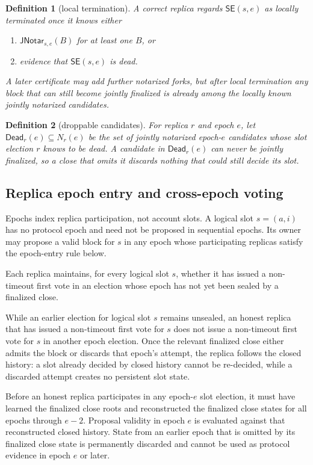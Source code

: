 \documentclass[11pt]{article}
\newtheorem{definition}{Definition}
\theoremstyle{remark}
\newcommand{\SE}{\mathsf{SE}}
\newcommand{\JNotar}{\mathsf{JNotar}}
\newcommand{\Dead}{\mathsf{Dead}}
\begin{document}
\begin{definition}[local termination]
A correct replica regards $\SE(s,e)$ as \emph{locally terminated} once it knows either
\begin{enumerate}[label=(\roman*),nosep]
  \item $\JNotar_{s,e}(B)$ for at least one $B$, or
  \item evidence that $\SE(s,e)$ is dead.
\end{enumerate}
A later certificate may add further notarized forks, but after local termination any block that can still become jointly finalized is already among the locally known jointly notarized candidates.
\end{definition}

\begin{definition}[droppable candidates]
For replica $r$ and epoch $e$, let $\Dead_r(e)\subseteq N_r(e)$ be the set of jointly notarized epoch-$e$ candidates whose slot election $r$ knows to be dead. A candidate in $\Dead_r(e)$ can never be jointly finalized, so a close that omits it discards nothing that could still decide its slot.
\end{definition}

\subsection{Replica epoch entry and cross-epoch voting}

Epochs index replica participation, not account slots. A logical slot $s=(a,i)$ has no protocol epoch and need not be proposed in sequential epochs. Its owner may propose a valid block for $s$ in any epoch whose participating replicas satisfy the epoch-entry rule below.

Each replica maintains, for every logical slot $s$, whether it has issued a non-timeout first vote in an election whose epoch has not yet been sealed by a finalized close.

\begin{description}[leftmargin=2.4em,labelindent=0em]
\item[R1 (one live non-timeout attempt).]
While an earlier election for logical slot $s$ remains unsealed, an honest replica that has issued a non-timeout first vote for $s$ does not issue a non-timeout first vote for $s$ in another epoch election. Once the relevant finalized close either admits the block or discards that epoch's attempt, the replica follows the closed history: a slot already decided by closed history cannot be re-decided, while a discarded attempt creates no persistent slot state.

\item[R2 (reconstructed epoch-entry rule).]
Before an honest replica participates in any epoch-$e$ slot election, it must have learned the finalized close roots and reconstructed the finalized close states for all epochs through $e-2$. Proposal validity in epoch $e$ is evaluated against that reconstructed closed history. State from an earlier epoch that is omitted by its finalized close state is permanently discarded and cannot be used as protocol evidence in epoch $e$ or later.
\end{description}
\end{document}
